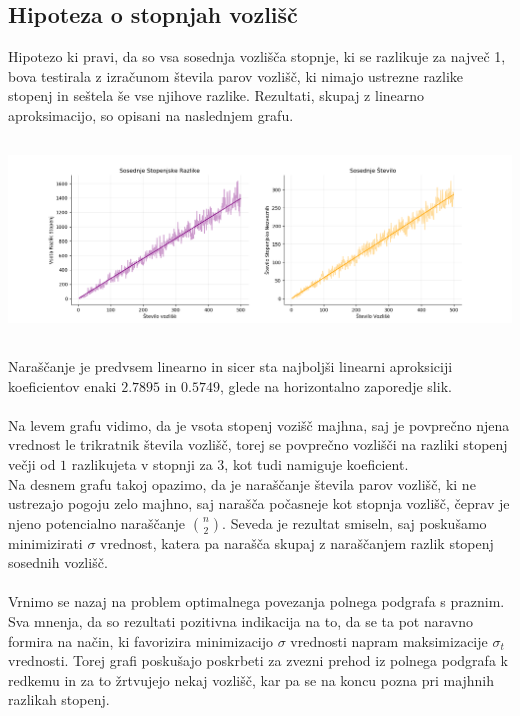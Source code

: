 \documentclass[ letterpaper, titlepage, fleqn]{article}
\begin{document}
\subsection{Hipoteza o stopnjah vozlišč}
Hipotezo ki pravi, da so vsa sosednja vozlišča stopnje, ki se razlikuje za največ 1, bova testirala
z izračunom števila parov vozlišč, ki nimajo ustrezne razlike stopenj in seštela še vse njihove razlike.
Rezultati, skupaj z linearno aproksimacijo, so opisani na naslednjem grafu.\\
\includegraphics[width=\textwidth, height=6cm]{graphics/degree_difference_linear_aproximation.png}\\
Naraščanje je predvsem linearno in sicer sta najboljši linearni aproksiciji koeficientov enaki
$2.7895$ in $0.5749$, glede na horizontalno zaporedje slik.
\\\\
Na levem grafu vidimo, da je vsota stopenj vozišč majhna, saj je povprečno njena vrednost
le trikratnik števila vozlišč, torej se povprečno vozlišči na razliki stopenj večji od $1$ razlikujeta v stopnji za $3$, 
kot tudi namiguje koeficient.\\
Na desnem grafu takoj opazimo, da je naraščanje števila parov vozlišč, ki ne ustrezajo pogoju
zelo majhno, saj narašča počasneje kot stopnja vozlišč, čeprav je njeno potencialno naraščanje
$\binom{n}{2}$. 
Seveda je rezultat smiseln, saj poskušamo minimizirati $\sigma$ vrednost, katera pa narašča
skupaj z naraščanjem razlik stopenj sosednih vozlišč. 
\\\\
Vrnimo se nazaj na problem optimalnega povezanja polnega podgrafa s praznim. 
Sva mnenja, da so rezultati pozitivna indikacija na to, da se ta pot naravno formira na način, 
ki favorizira minimizacijo $\sigma$ vrednosti napram maksimizacije $\sigma_t$ vrednosti.
Torej grafi poskušajo poskrbeti za zvezni prehod iz polnega podgrafa k redkemu in za to 
žrtvujejo nekaj vozlišč, kar pa se na koncu pozna pri majhnih razlikah stopenj.
\end{document}
